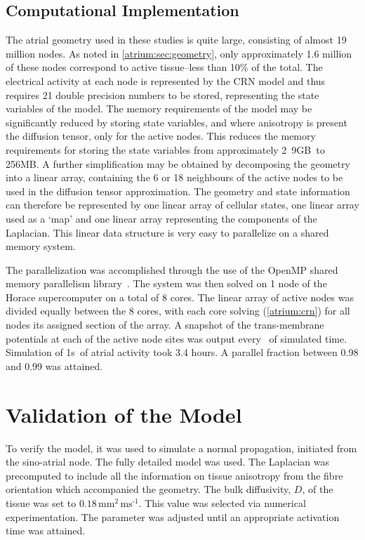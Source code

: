 \subsection{Computational Implementation}

The atrial geometry used in these studies is quite large, consisting of almost
19 million nodes.
As noted in \ref{atrium:sec:geometry}, only approximately 1.6 million of these
nodes correspond to active tissue--less than 10\% of the total.
The electrical activity at each node is represented by the CRN model and thus
requires 21 double precision numbers to be stored, representing the state
variables of the model.
The memory requirements of the model may be significantly reduced by storing
state variables, and where anisotropy is present the diffusion tensor, only for
the active nodes.
This reduces the memory requirements for storing the state variables from
approximately \unit{2.9}{GB}\ to \unit{256}{MB}.
A further simplification may be obtained by decomposing the geometry into a
linear array, containing the 6 or 18 neighbours of the active nodes to be used
in the diffusion tensor approximation.
The geometry and state information can therefore be represented by one linear
array of cellular states, one linear array used as a `map' and one
linear array representing the components of the Laplacian.
This linear data structure is very easy to parallelize on a shared memory
system.

The parallelization was accomplished through the use of the OpenMP shared
memory parallelism library~\cite{OpenMP}.
The system was then solved on 1 node of the Horace supercomputer on a total of 8
cores.
The linear array of active nodes was divided equally between the 8 cores, with
each core solving (\ref{atrium:crn}) for all nodes its assigned section of the
array.
A snapshot of the trans-membrane potentials at each of the active node sites was
output every \ of simulated time.
Simulation of \unit{1}{s}\ of atrial activity took 3.4 hours.
A parallel fraction between 0.98 and 0.99 was attained.

\section{Validation of the Model}

To verify the model, it was used to simulate a normal propagation, initiated
from the sino-atrial node.
The fully detailed model was used.
The Laplacian was precomputed to include all the information on tissue
anisotropy from the fibre orientation which accompanied the geometry.
The bulk diffusivity, $D$, of the tissue was set to $0.18\,\text{mm}^{\text{2}}\,\text{ms}^{\text{-1}}$.
This value was selected via numerical experimentation.
The parameter was adjusted until an appropriate activation time was attained.


